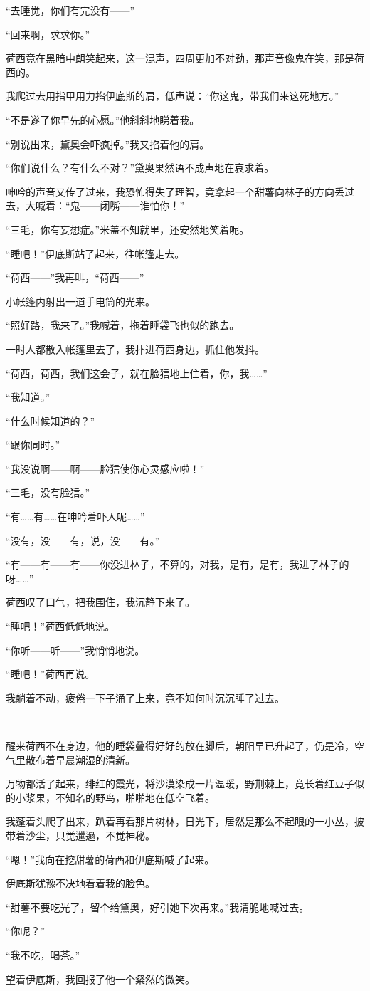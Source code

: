 \par “去睡觉，你们有完没有——”
\par “回来啊，求求你。”
\par 荷西竟在黑暗中朗笑起来，这一混声，四周更加不对劲，那声音像鬼在笑，那是荷西的。
\par 我爬过去用指甲用力掐伊底斯的肩，低声说：“你这鬼，带我们来这死地方。”
\par “不是遂了你早先的心愿。”他斜斜地睇着我。
\par “别说出来，黛奥会吓疯掉。”我又掐着他的肩。
\par “你们说什么？有什么不对？”黛奥果然语不成声地在哀求着。
\par 呻吟的声音又传了过来，我恐怖得失了理智，竟拿起一个甜薯向林子的方向丢过去，大喊着：“鬼——闭嘴——谁怕你！”
\par “三毛，你有妄想症。”米盖不知就里，还安然地笑着呢。
\par “睡吧！”伊底斯站了起来，往帐篷走去。
\par “荷西——”我再叫，“荷西——”
\par 小帐篷内射出一道手电筒的光来。
\par “照好路，我来了。”我喊着，拖着睡袋飞也似的跑去。
\par 一时人都散入帐篷里去了，我扑进荷西身边，抓住他发抖。
\par “荷西，荷西，我们这会子，就在脸狺地上住着，你，我……”
\par “我知道。”
\par “什么时候知道的？”
\par “跟你同时。”
\par “我没说啊——啊——脸狺使你心灵感应啦！”
\par “三毛，没有脸狺。”
\par “有……有……在呻吟着吓人呢……”
\par “没有，没——有，说，没——有。”
\par “有——有——有——你没进林子，不算的，对我，是有，是有，我进了林子的呀……”
\par 荷西叹了口气，把我围住，我沉静下来了。
\par “睡吧！”荷西低低地说。
\par “你听——听——”我悄悄地说。
\par “睡吧！”荷西再说。
\par 我躺着不动，疲倦一下子涌了上来，竟不知何时沉沉睡了过去。
\par  
\par 醒来荷西不在身边，他的睡袋叠得好好的放在脚后，朝阳早已升起了，仍是冷，空气里散布着早晨潮湿的清新。
\par 万物都活了起来，绯红的霞光，将沙漠染成一片温暖，野荆棘上，竟长着红豆子似的小浆果，不知名的野鸟，啪啪地在低空飞着。
\par 我蓬着头爬了出来，趴着再看那片树林，日光下，居然是那么不起眼的一小丛，披带着沙尘，只觉邋遢，不觉神秘。
\par “嗯！”我向在挖甜薯的荷西和伊底斯喊了起来。
\par 伊底斯犹豫不决地看着我的脸色。
\par “甜薯不要吃光了，留个给黛奥，好引她下次再来。”我清脆地喊过去。
\par “你呢？”
\par “我不吃，喝茶。”
\par 望着伊底斯，我回报了他一个粲然的微笑。

